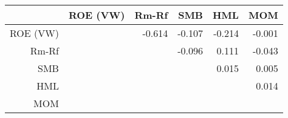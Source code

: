 \begin{table}[ht]
\centering
\begin{tabular}{rrrrrr}
  \hline
 & ROE (VW) & Rm-Rf & SMB & HML & MOM \\ 
  \hline
ROE (VW) &  & -0.614 & -0.107 & -0.214 & -0.001 \\ 
  Rm-Rf &  &  & -0.096 & 0.111 & -0.043 \\ 
  SMB &  &  &  & 0.015 & 0.005 \\ 
  HML &  &  &  &  & 0.014 \\ 
  MOM &  &  &  &  &  \\ 
   \hline
\end{tabular}
\end{table}
